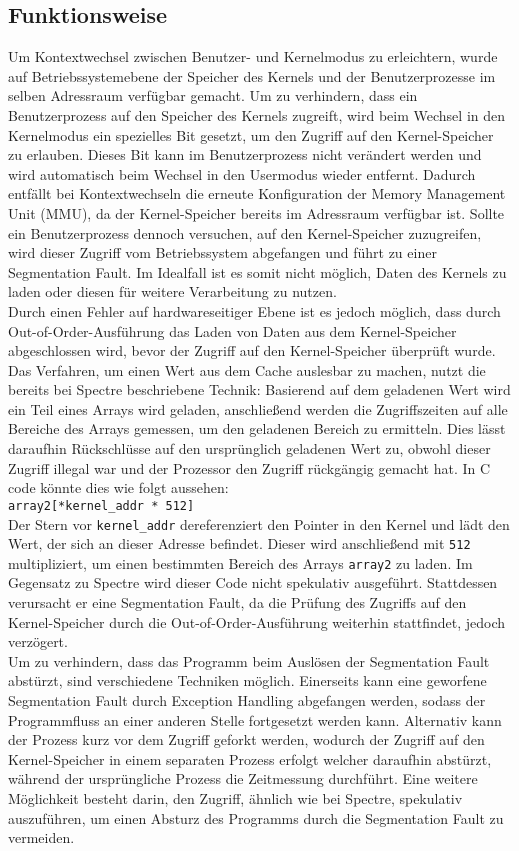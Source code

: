 \subsection{Funktionsweise}
\label{subsec:meltdown_funktionsweise}
Um Kontextwechsel zwischen Benutzer- und Kernelmodus zu erleichtern, wurde auf Betriebssystemebene der Speicher des Kernels und der Benutzerprozesse im selben Adressraum verfügbar gemacht.
Um zu verhindern, dass ein Benutzerprozess auf den Speicher des Kernels zugreift, wird beim Wechsel in den Kernelmodus ein spezielles Bit gesetzt, um den Zugriff auf den Kernel-Speicher zu erlauben.
Dieses Bit kann im Benutzerprozess nicht verändert werden und wird automatisch beim Wechsel in den Usermodus wieder entfernt.
Dadurch entfällt bei Kontextwechseln die erneute Konfiguration der Memory Management Unit (MMU), da der Kernel-Speicher bereits im Adressraum verfügbar ist.
Sollte ein Benutzerprozess dennoch versuchen, auf den Kernel-Speicher zuzugreifen, wird dieser Zugriff vom Betriebssystem abgefangen und führt zu einer Segmentation Fault.
Im Idealfall ist es somit nicht möglich, Daten des Kernels zu laden oder diesen für weitere Verarbeitung zu nutzen. \\
Durch einen Fehler auf hardwareseitiger Ebene ist es jedoch möglich, dass durch Out-of-Order-Ausführung das Laden von Daten aus dem Kernel-Speicher abgeschlossen wird, bevor der Zugriff auf den Kernel-Speicher überprüft wurde.
Das Verfahren, um einen Wert aus dem Cache auslesbar zu machen, nutzt die bereits bei Spectre beschriebene Technik: Basierend auf dem geladenen Wert wird ein Teil eines Arrays wird geladen, anschließend werden die Zugriffszeiten auf alle Bereiche des Arrays gemessen, um den geladenen Bereich zu ermitteln.
Dies lässt daraufhin Rückschlüsse auf den ursprünglich geladenen Wert zu, obwohl dieser Zugriff illegal war und der Prozessor den Zugriff rückgängig gemacht hat.
In C code könnte dies wie folgt aussehen:\\
\texttt{array2[*kernel\_addr * 512]}\\
Der Stern vor \texttt{kernel\_addr} dereferenziert den Pointer in den Kernel und lädt den Wert, der sich an dieser Adresse befindet.
Dieser wird anschließend mit \texttt{512} multipliziert, um einen bestimmten Bereich des Arrays \texttt{array2} zu laden.
Im Gegensatz zu Spectre wird dieser Code nicht spekulativ ausgeführt.
Stattdessen verursacht er eine Segmentation Fault, da die Prüfung des Zugriffs auf den Kernel-Speicher durch die Out-of-Order-Ausführung weiterhin stattfindet, jedoch verzögert.\\
Um zu verhindern, dass das Programm beim Auslösen der Segmentation Fault abstürzt, sind verschiedene Techniken möglich.
Einerseits kann eine geworfene Segmentation Fault durch Exception Handling abgefangen werden, sodass der Programmfluss an einer anderen Stelle fortgesetzt werden kann.
Alternativ kann der Prozess kurz vor dem Zugriff geforkt werden, wodurch der Zugriff auf den Kernel-Speicher in einem separaten Prozess erfolgt welcher daraufhin abstürzt, während der ursprüngliche Prozess die Zeitmessung durchführt.
Eine weitere Möglichkeit besteht darin, den Zugriff, ähnlich wie bei Spectre, spekulativ auszuführen, um einen Absturz des Programms durch die Segmentation Fault zu vermeiden.

